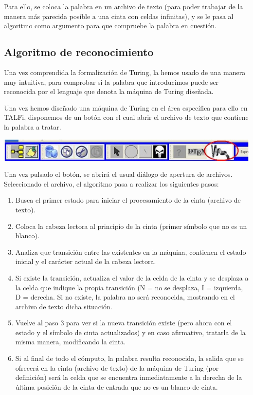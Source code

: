\documentclass[12pt,a4paper,spanish]{book}
\begin{document}
Para ello, se coloca la palabra en un archivo de texto (para poder trabajar de la manera m\'as parecida posible a una cinta con celdas infinitas), y se le pasa al algoritmo como argumento para que compruebe la palabra en cuesti\'on.

\subsection{Algoritmo de reconocimiento}
Una vez comprendida la formalizaci\'on de Turing, la hemos usado de una manera muy intuitiva, para comprobar si la palabra que introducimos puede ser reconocida por el lenguaje que denota la m\'aquina de Turing dise\~nada.

Una vez hemos dise\~nado una m\'aquina de Turing en el \'area espec\'ifica para ello en TALFi, disponemos de un bot\'on con el cual abrir el archivo de texto que contiene la palabra a tratar.

\begin{center}
\includegraphics{turi2.jpg}
\end{center}

Una vez pulsado el bot\'on, se abrir\'a el usual di\'alogo de apertura de archivos. Seleccionado el archivo, el algoritmo pasa a realizar los siguientes pasos:
\begin{enumerate}
\item Busca el primer estado para iniciar el procesamiento de la cinta (archivo de texto).
\item Coloca la cabeza lectora al principio de la cinta (primer s\'imbolo que no es un blanco).
\item Analiza que transici\'on entre las existentes en la m\'aquina, contienen el estado inicial y el car\'acter actual de la cabeza lectora.
\item Si existe la transici\'on, actualiza el valor de la celda de la cinta y se desplaza a la celda que indique la propia transici\'on (N =  no se desplaza, I = izquierda, D = derecha. Si no existe, la palabra no ser\'a reconocida, mostrando en el archivo de texto dicha situaci\'on.
\item Vuelve al paso 3 para ver si la nueva transici\'on existe (pero ahora con el estado y el s\'imbolo de cinta actualizados) y en caso afirmativo, tratarla de la misma manera, modificando la cinta.
\item Si al final de todo el c\'omputo, la palabra resulta reconocida, la salida que se ofrecer\'a en la cinta (archivo de texto) de la m\'aquina de Turing (por definici\'on) ser\'a la celda que se encuentra inmediatamente a la derecha de la \'ultima posici\'on de la cinta de entrada que no es un blanco de cinta.
\end{enumerate}
\end{document}
